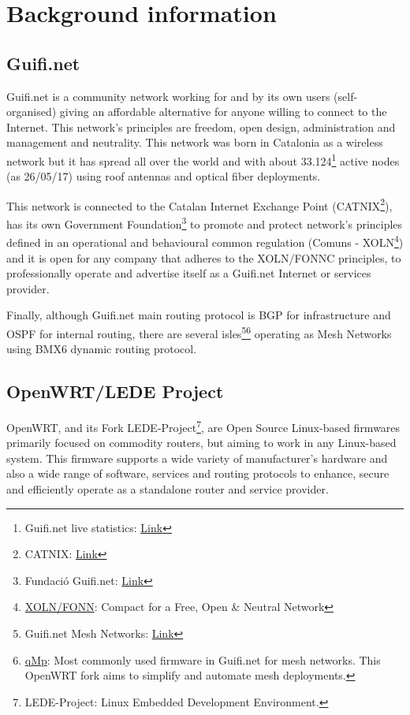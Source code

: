 \section{Background information}
\label{sec:backc}
\subsection{Guifi.net}
\label{subsec:gn}
Guifi.net is a community network working for and by its own users (self-organised) giving an affordable alternative for anyone willing to connect to the Internet. This network's principles are freedom, open design, administration and management and neutrality. This network was born in Catalonia as a wireless network but it has spread all over the world and with about 33.124\footnote{Guifi.net live statistics: \href{https://guifi.net/guifi/menu/stats/nodes}{Link}} active nodes (as 26/05/17) using roof antennas and optical fiber deployments.

This network is connected to the Catalan Internet Exchange Point (CATNIX\footnote{CATNIX: \href{http://www.catnix.net/en/}{Link}}), has its own Government Foundation\footnote{Fundació Guifi.net: \href{https://fundacio.guifi.net/Foundation}{Link}} to promote and protect network's principles defined in an operational and behavioural common regulation (Comuns - XOLN\footnote{\href{https://guifi.net/en/FONNC}{XOLN/FONN}: Compact for a Free, Open \& Neutral Network}) and it is open for any company that adheres to the XOLN/FONNC principles, to professionally operate and advertise itself as a Guifi.net Internet or services provider. 

Finally, although Guifi.net main routing protocol is BGP for infrastructure and OSPF for internal routing, there are several isles\footnote{Guifi.net Mesh Networks: \href{http://ca.wiki.guifi.net/wiki/Annex:subxarxes_mesh}{Link}}\footnote{\href{http://qmp.party/Documentation}{qMp}: Most commonly used firmware in Guifi.net for mesh networks. This OpenWRT fork aims to simplify and automate mesh deployments.} operating as Mesh Networks using BMX6 dynamic routing protocol.

\subsection{OpenWRT/LEDE Project}
\label{subsec:owrtlp}
OpenWRT, and its Fork LEDE-Project\footnote{LEDE-Project: Linux Embedded Development Environment.}, are Open Source Linux-based firmwares primarily focused on commodity routers, but aiming to work in any Linux-based system. This firmware supports a wide variety of manufacturer's hardware and also a wide range of software, services and routing protocols to enhance, secure and efficiently operate as a standalone router and service provider.

